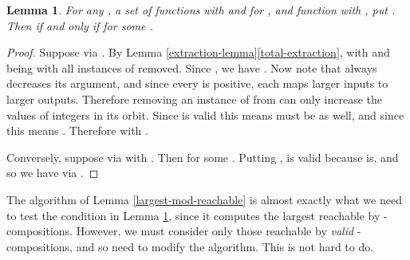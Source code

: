 \documentclass[11pt]{amsart}
\newtheorem{lemma}{Lemma}
\theoremstyle{definition}
\theoremstyle{remark}
\begin{document}
\begin{lemma} \label{n-lemma-cases}
For any , a set  of functions  with  and  for , and function  with , put . Then  if and only if  for some .
\end{lemma}
\begin{proof}
Suppose  via . By Lemma \ref{extraction-lemma}\ref{total-extraction},  with  and  being  with all instances of  removed. Since , we have . Now note that  always decreases its argument, and since every  is positive, each  maps larger inputs to larger outputs. Therefore removing an instance of  from  can only increase the values of integers in its orbit. Since  is valid this means  must be as well, and since  this means . Therefore  with .

Conversely, suppose  via  with . Then  for some . Putting ,  is valid because  is, and so we have  via .
\end{proof}

The algorithm of Lemma \ref{largest-mod-reachable} is almost exactly what we need to test the condition in Lemma \ref{n-lemma-cases}, since it computes the largest  reachable by -compositions. However, we must consider only those reachable by \emph{valid} -compositions, and so need to modify the algorithm. This is not hard to do.
\end{document}
